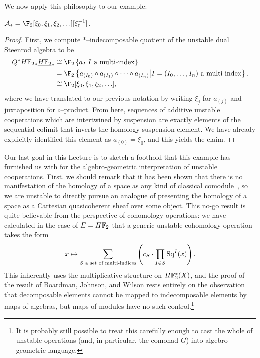 We now apply this philosophy to our example:
\begin{corollary}\label{StarIndecompsInUDualSteenrodAlg}
$\mathcal A_* = \F_2[\xi_0, \xi_1, \xi_2, \ldots][\xi_0^{-1}]$.
\end{corollary}
\begin{proof}
First, we compute $\ast$--indecomposable quotient of the unstable dual Steenrod algebra to be
\begin{align*}
Q^\ast \HFtwo_* \OS{\HFtwo}{*} & \cong \F_2\left\{a_{I} \middle| \text{$I$ a multi-index}\right\} \\
& = \F_2\left\{ a_{(I_0)} \circ a_{(I_1)} \circ \cdots \circ a_{(I_n)} \middle| \text{$I = (I_0, \ldots, I_n)$ a multi-index}\right\}. \\
& \cong \F_2[\xi_0, \xi_1, \xi_2, \ldots],
\end{align*}
where we have translated to our previous notation by writing $\xi_j$ for $a_{(j)}$ and juxtaposition for $\circ$--product.  From here, sequences of additive unstable cooperations which are intertwined by suspension are exactly elements of the sequential colimit that inverts the homology suspension element.  We have already explicitly identified this element as $a_{(0)} = \xi_0$, and this yields the claim.
\end{proof}

Our last goal in this Lecture is to sketch a foothold that this example has furnished us with for the algebro-geometric interpretation of unstable cooperations.  First, we should remark that it has been shown that there is no manifestation of the homology of a space as any kind of classical comodule~\cite[Theorem 9.4]{BJW}, so we are unstable to directly pursue an analogue of  presenting the homology of a space as a Cartesian quasicoherent sheaf over some object.  This no-go result is quite believable from the perspective of cohomology operations: we have calculated in the case of $E = \HFtwo$ that a generic unstable cohomology operation takes the form \[x \mapsto \sum_{\text{$S$ a set of multi-indices}} \left(c_S \cdot \prod_{I \in S} \operatorname{Sq}^I(x)\right).\]  This inherently uses the multiplicative structure on $\HFtwo^*(X)$, and the proof of the result of Boardman, Johnson, and Wilson rests entirely on the observation that decomposable elements cannot be mapped to indecomposable elements by maps of algebras, but maps of modules have no such control.\footnote{It is probably still possible to treat this carefully enough to cast the whole of unstable operations (and, in particular, the comonad $G$) into algebro-geometric language.}

